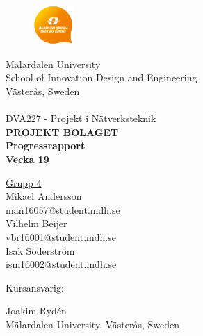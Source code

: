 
\begin{center}
		\begin{figure}[t]	
				\includegraphics[width=15mm, viewport=0 0 100 100]{MDHlogga.png}
		\end{figure}
                 	\Large M\"{a}lardalen University \\
			\Large School of Innovation Design and Engineering \\
                        \Large V\"{a}ster\r{a}s, Sweden\\

                        \noindent\makebox[\linewidth]{\rule{\textwidth}{0.4pt}}\\[0.5cm]
                
                \Large {DVA227 - Projekt i Nätverksteknik}\\[1.0cm]

			\huge \textbf{\uppercase{Projekt Bolaget}} \\ [1.0cm] %
            \LARGE \textbf{Progressrapport \\Vecka 19 }
				
			\LARGE \underline{Grupp 4}\\
			\LARGE Mikael Andersson  \\
            \large man16057@student.mdh.se \\[0.7cm]
            \LARGE Vilhelm Beijer   \\
            \large vbr16001@student.mdh.se \\[0.7cm]
            \LARGE Isak Söderström   \\
            \large ism16002@student.mdh.se \\[0.7cm]	

\begin{flushleft}
 			\Large \hspace{0.04cm} Kursansvarig:  \begin{minipage}[t]{0,7\textwidth}\Large  Joakim Rydén\\
			\large Mälardalen University, \large Västerås, Sweden\\ \end{minipage}\\[0.5cm]
			

\end{flushleft}
\end{center}
